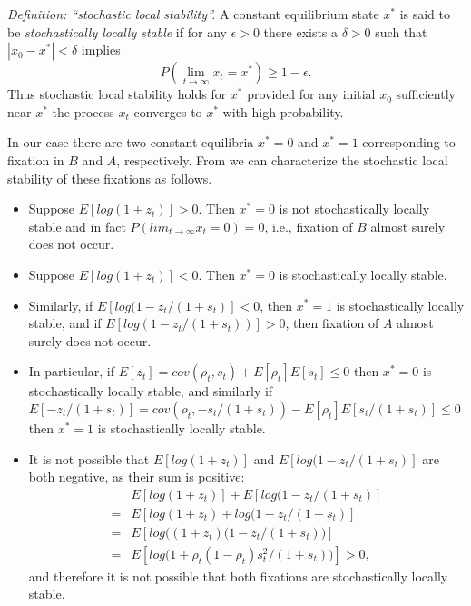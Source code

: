 \documentclass[14pt]{extarticle}
\begin{document}
{\it Definition: ``stochastic local stability''.}
A constant equilibrium state $x^*$ is said to be \emph{stochastically locally stable} if for any $\epsilon>0$ there exists a $\delta>0$ such that $|x_0-x^*|<\delta$ implies
\begin{equation}
P(\lim_{t \to \infty}x_t = x^*) \ge 1-\epsilon.
\end{equation}
Thus stochastic local stability holds for $x^*$ provided for any initial $x_0$ sufficiently near $x^*$ the process $x_t$ converges to $x^*$ with high probability.

In our case there are two constant equilibria $x^*=0$ and $x^*=1$ corresponding to fixation in $B$ and $A$, respectively.
From \citet[][results~6 and 7]{Ram2018} we can characterize the stochastic local stability of these fixations as follows.

\begin{itemize}
\item Suppose $E[log(1+z_t)]>0$. Then $x^*=0$ is not stochastically locally stable and in fact $P(lim_{t \to \infty} x_t=0) = 0$, i.e., fixation of $B$ almost surely does not occur.
\item Suppose $E[log(1+z_t)]<0$. Then $x^*=0$ is stochastically locally stable. 
\item Similarly, if $E[log(1-z_t/(1+s_t)]<0$, then $x^*=1$ is stochastically locally stable, and if $E[log(1-z_t/(1+s_t))]>0$, then fixation of $A$ almost surely does not occur.
\item In particular, if $E[z_t] = cov(\rho_t, s_t) + E[\rho_t] E[s_t] \le 0$ then $x^*=0$ is stochastically locally stable, and similarly if $E[-z_t/(1+s_t)] = cov(\rho_t, -s_t/(1+s_t)) - E[\rho_t] E[s_t/(1+s_t)] \le 0$ then $x^*=1$ is stochastically locally stable.
\item It is not possible that $E[log(1+z_t)]$ and $E[log(1-z_t/(1+s_t)]$ are both negative, as their sum is positive:
\begin{equation}\begin{aligned}
{}&E[log(1+z_t)] + E[log(1-z_t/(1+s_t)]  \\
={} &E[log(1+z_t) + log(1-z_t/(1+s_t)] \\
={} &E[log\big((1+z_t)(1-z_t/(1+s_t)\big)] \\
={} &E[log\big( 1+\rho_t(1-\rho_t)s_t^2/(1+s_t) \big)] > 0,
\end{aligned}\end{equation}
and therefore it is not possible that both fixations are stochastically locally stable.
\end{itemize}
\end{document}
